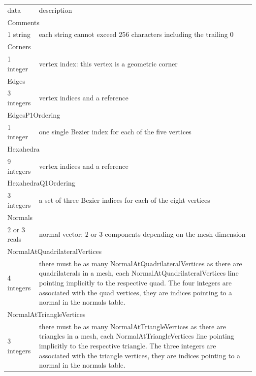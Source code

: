 \documentclass[a4paper,12pt]{article}
\begin{document}
\setlongtables
\begin{longtable}{|m{4cm}|m{11cm}|}
\endhead
\endfoot

\hline
\multicolumn{2}{|l|}{keyword} \\
\hline
data & description \\
\hline\hline

\multicolumn{2}{|l|}{Comments} \\
\hline
1 string & each string cannot exceed 256 characters including the trailing 0 \\
\hline\hline

\multicolumn{2}{|l|}{Corners} \\
\hline
1 integer & vertex index: this vertex is a geometric corner \\
\hline\hline

\multicolumn{2}{|l|}{Edges} \\
\hline
3 integers & vertex indices and a reference \\
\hline\hline

\multicolumn{2}{|l|}{EdgesP1Ordering} \\
\hline
1 integer & one single Bezier index for each of the five vertices \\
\hline\hline

\multicolumn{2}{|l|}{Hexahedra} \\
\hline
9 integers & vertex indices and a reference \\
\hline\hline

\multicolumn{2}{|l|}{HexahedraQ1Ordering} \\
\hline
3 integers & a set of three Bezier indices for each of the eight vertices \\
\hline\hline

\multicolumn{2}{|l|}{Normals} \\
\hline
2 or 3 reals & normal vector: 2 or 3 components depending on the mesh dimension \\
\hline\hline

\multicolumn{2}{|l|}{NormalAtQuadrilateralVertices} \\
\hline
4 integers & there must be as many NormalAtQuadrilateralVertices as there are quadrilaterals in a mesh, each NormalAtQuadrilateralVertices line pointing implicitly to the respective quad. The four integers are associated with the quad vertices, they are indices pointing to a normal in the normals table. \\
\hline\hline

\multicolumn{2}{|l|}{NormalAtTriangleVertices} \\
\hline
3 integers & there must be as many NormalAtTriangleVertices as there are triangles in a mesh, each NormalAtTriangleVertices line pointing implicitly to the respective triangle. The three integers are associated with the triangle vertices, they are indices pointing to a normal in the normals table. \\
\hline\hline


\end{longtable}
\end{document}
